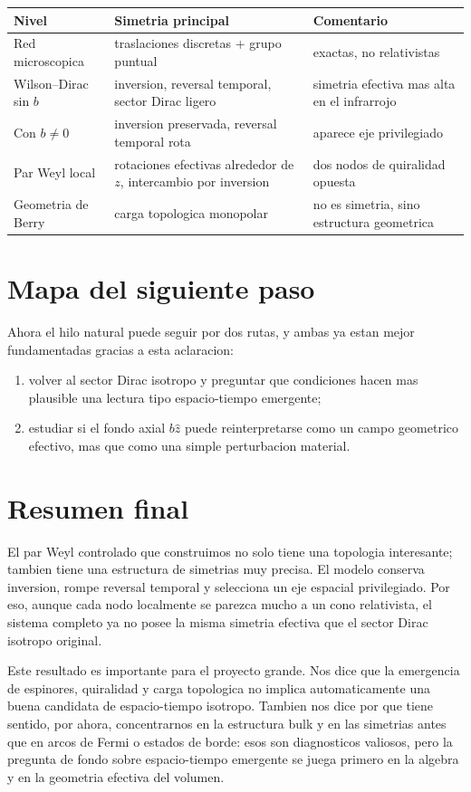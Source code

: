 \begin{center}
\begin{tabular}{p{3.5cm} p{4.4cm} p{5.3cm}}
\toprule
Nivel & Simetria principal & Comentario \\
\midrule
Red microscopica & traslaciones discretas + grupo puntual & exactas, no relativistas \\
Wilson--Dirac sin \(b\) & inversion, reversal temporal, sector Dirac ligero & simetria efectiva mas alta en el infrarrojo \\
Con \(b\neq 0\) & inversion preservada, reversal temporal rota & aparece eje privilegiado \\
Par Weyl local & rotaciones efectivas alrededor de \(z\), intercambio por inversion & dos nodos de quiralidad opuesta \\
Geometria de Berry & carga topologica monopolar & no es simetria, sino estructura geometrica \\
\bottomrule
\end{tabular}
\end{center}

\section{Mapa del siguiente paso}
Ahora el hilo natural puede seguir por dos rutas, y ambas ya estan mejor fundamentadas gracias a esta aclaracion:
\begin{enumerate}[label=\arabic*.]
    \item volver al sector Dirac isotropo y preguntar que condiciones hacen mas plausible una lectura tipo espacio-tiempo emergente;
    \item estudiar si el fondo axial \(b\hat{z}\) puede reinterpretarse como un campo geometrico efectivo, mas que como una simple perturbacion material.
\end{enumerate}

\section{Resumen final}
El par Weyl controlado que construimos no solo tiene una topologia interesante; tambien tiene una estructura de simetrias muy precisa. El modelo conserva inversion, rompe reversal temporal y selecciona un eje espacial privilegiado. Por eso, aunque cada nodo localmente se parezca mucho a un cono relativista, el sistema completo ya no posee la misma simetria efectiva que el sector Dirac isotropo original.

Este resultado es importante para el proyecto grande. Nos dice que la emergencia de espinores, quiralidad y carga topologica no implica automaticamente una buena candidata de espacio-tiempo isotropo. Tambien nos dice por que tiene sentido, por ahora, concentrarnos en la estructura bulk y en las simetrias antes que en arcos de Fermi o estados de borde: esos son diagnosticos valiosos, pero la pregunta de fondo sobre espacio-tiempo emergente se juega primero en la algebra y en la geometria efectiva del volumen.
